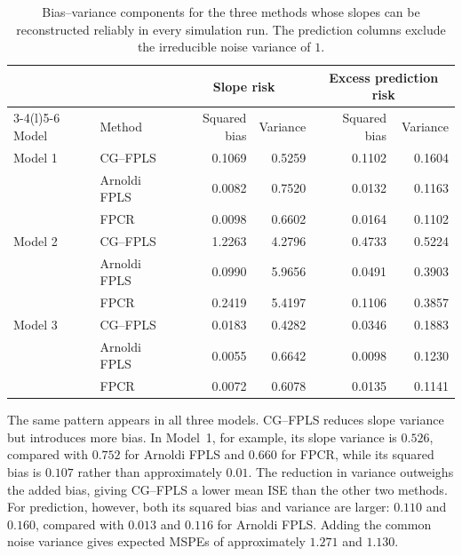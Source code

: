 \begin{table}[htbp]
    \centering
    \scriptsize
    \caption[Bias--variance components for CG--FPLS, Arnoldi FPLS, and FPCR]{Bias--variance components for the three methods whose slopes can
    be reconstructed reliably in every simulation run.  The prediction
    columns exclude the irreducible noise variance of $1$.}
    \label{tab:results-bias-variance}
    \begin{tabular}{@{}llrrrr@{}}
        \toprule
        & & \multicolumn{2}{c}{Slope risk}
          & \multicolumn{2}{c}{Excess prediction risk} \\
        \cmidrule(lr){3-4}\cmidrule(l){5-6}
        Model & Method & Squared bias & Variance & Squared bias & Variance \\
        \midrule
        Model 1 & CG--FPLS     & 0.1069 & 0.5259 & 0.1102 & 0.1604 \\
                & Arnoldi FPLS & 0.0082 & 0.7520 & 0.0132 & 0.1163 \\
                & FPCR         & 0.0098 & 0.6602 & 0.0164 & 0.1102 \\
        \addlinespace
        Model 2 & CG--FPLS     & 1.2263 & 4.2796 & 0.4733 & 0.5224 \\
                & Arnoldi FPLS & 0.0990 & 5.9656 & 0.0491 & 0.3903 \\
                & FPCR         & 0.2419 & 5.4197 & 0.1106 & 0.3857 \\
        \addlinespace
        Model 3 & CG--FPLS     & 0.0183 & 0.4282 & 0.0346 & 0.1883 \\
                & Arnoldi FPLS & 0.0055 & 0.6642 & 0.0098 & 0.1230 \\
                & FPCR         & 0.0072 & 0.6078 & 0.0135 & 0.1141 \\
        \bottomrule
    \end{tabular}
\end{table}

The same pattern appears in all three models.  CG--FPLS reduces slope
variance but introduces more bias.  In Model~1, for example, its slope
variance is $0.526$, compared with $0.752$ for Arnoldi FPLS and $0.660$ for
FPCR, while its squared bias is $0.107$ rather than approximately $0.01$.
The reduction in variance outweighs the added bias, giving CG--FPLS a lower
mean ISE than the other two methods.  For prediction, however, both its
squared bias and variance are larger: $0.110$ and $0.160$, compared with
$0.013$ and $0.116$ for Arnoldi FPLS.  Adding the common noise variance gives
expected MSPEs of approximately $1.271$ and $1.130$.

